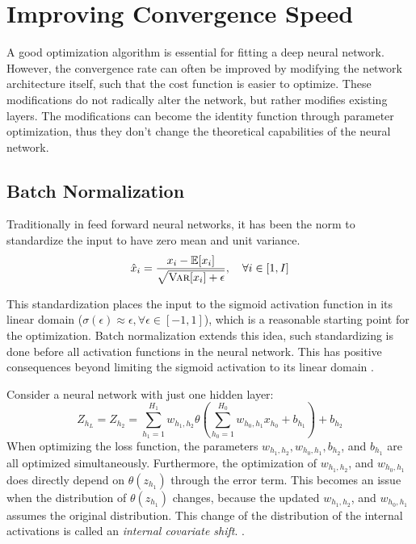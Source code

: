 \section{Improving Convergence Speed}
\label{sec:convergence}

A good optimization algorithm is essential for fitting a deep neural network. However, the convergence rate can often be improved by modifying the network architecture itself, such that the cost function is easier to optimize. These modifications do not radically alter the network, but rather modifies existing layers. The modifications can become the identity function through parameter optimization, thus they don't change the theoretical capabilities of the neural network.

\subsection{Batch Normalization}
Traditionally in feed forward neural networks, it has been the norm to standardize the input to have zero mean and unit variance.
\begin{equation}
\hat{x}_i = \frac{x_i - \mathbb{E}[x_i]}{\sqrt{\textsc{Var}[x_i] + \epsilon}}, \quad \forall i \in [1, I]
\end{equation}

This standardization places the input to the sigmoid activation function in its linear domain ($\sigma(\epsilon) \approx \epsilon, \forall \epsilon \in [-1, 1]$), which is a reasonable starting point for the optimization. Batch normalization extends this idea, such standardizing is done before all activation functions in the neural network. This has positive consequences beyond limiting the sigmoid activation to its linear domain \cite{batch-normalization}.

Consider a neural network with just one hidden layer:
\begin{equation}
Z_{h_L} = Z_{h_2} = \sum_{h_1 = 1}^{H_1} w_{h_1, h_2} \theta\left(\sum_{h_0 = 1}^{H_0} w_{h_0, h_1} x_{h_0} + b_{h_1}\right) + b_{h_2}
\end{equation}
When optimizing the loss function, the parameters $w_{h_1, h_2}, w_{h_0, h_1}, b_{h_2}$, and $b_{h_1}$ are all optimized simultaneously. Furthermore, the optimization of $w_{h_1, h_2}$, and $w_{h_0, h_1}$ does directly depend on $\theta(z_{h_1})$ through the error term. This becomes an issue when the distribution of $\theta(z_{h_1})$ changes, because the updated $w_{h_1, h_2}$, and $w_{h_0, h_1}$ assumes the original distribution. This change of the distribution of the internal activations is called an \textit{internal covariate shift}. \cite{batch-normalization}.

